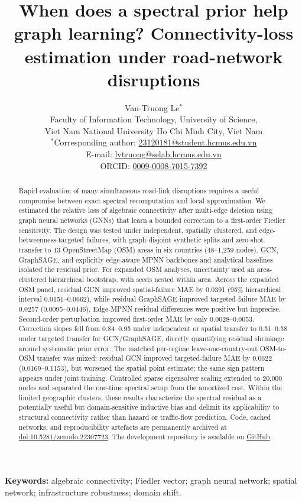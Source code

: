 \documentclass[11pt]{article}
\title{When does a spectral prior help graph learning? Connectivity-loss estimation under road-network disruptions}
\author{Van-Truong Le$^{*}$\\
\small Faculty of Information Technology, University of Science,\\
\small Viet Nam National University Ho Chi Minh City, Viet Nam\\
\small $^{*}$Corresponding author:
\href{mailto:23120181@student.hcmus.edu.vn}{23120181@student.hcmus.edu.vn}\\
\small E-mail: \href{mailto:lvtruong@selab.hcmus.edu.vn}{lvtruong@selab.hcmus.edu.vn}\\
\small ORCID: \href{https://orcid.org/0009-0008-7015-7392}{0009-0008-7015-7392}}
\date{}
\begin{document}
\maketitle

\begin{abstract}
Rapid evaluation of many simultaneous road-link disruptions requires a useful
compromise between exact spectral recomputation and local approximation. We
estimated the relative loss of algebraic connectivity after multi-edge deletion
using graph neural networks (GNNs) that learn a bounded correction to a
first-order Fiedler sensitivity. The design was tested under independent,
spatially clustered, and edge-betweenness-targeted failures, with graph-disjoint
synthetic splits and zero-shot transfer to 13 OpenStreetMap (OSM) areas in six
countries (48--1,259 nodes). GCN, GraphSAGE, and explicitly edge-aware MPNN
backbones and analytical baselines isolated the residual prior. For expanded OSM
analyses, uncertainty used an area-clustered hierarchical bootstrap, with seeds
nested within area. Across the expanded
OSM panel, residual GCN improved spatial-failure MAE by 0.0391 (95\% hierarchical
interval 0.0151--0.0662), while residual GraphSAGE improved targeted-failure MAE
by 0.0257 (0.0095--0.0446). Edge-MPNN residual differences were positive but
imprecise. Second-order perturbation improved first-order MAE by only
0.0028--0.0053. Correction slopes fell from 0.84--0.95 under independent or
spatial transfer to 0.51--0.58 under targeted transfer for GCN/GraphSAGE,
directly quantifying residual shrinkage around systematic prior error.
The matched per-regime leave-one-country-out OSM-to-OSM transfer was mixed: residual
GCN improved targeted-failure MAE by 0.0622 (0.0169--0.1153), but worsened the
spatial point estimate; the same sign pattern appears under joint training.
Controlled sparse eigensolver scaling extended to 20,000 nodes and separated the one-time
spectral setup from the amortized cost. Within the limited geographic
clusters, these results characterize the spectral residual as a potentially useful
but domain-sensitive inductive bias and delimit
its applicability to structural connectivity rather than hazard or traffic-flow
prediction. Code, cached networks, and reproducibility artefacts are permanently
archived at \href{https://doi.org/10.5281/zenodo.22307723}{doi:10.5281/zenodo.22307723}.
The development repository is available on
\href{https://github.com/lee-vtruong/ResiliRoad}{GitHub}.
\end{abstract}

\noindent\textbf{Keywords:} algebraic connectivity; Fiedler vector; graph neural
network; spatial network; infrastructure robustness; domain shift.
\end{document}
